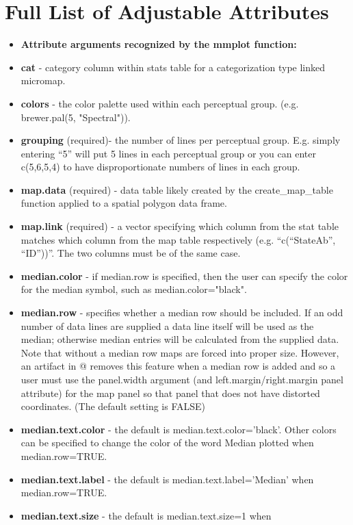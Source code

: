 \documentclass{article}
\begin{document}
\section{Full List of Adjustable Attributes}
\begin{itemize}
\item  \textbf{Attribute arguments recognized by the mmplot function:}
\item  \textbf{cat} - category column within stats table for a categorization type linked micromap.
\item  \textbf{colors} - the color palette used within each perceptual group. (e.g. brewer.pal(5, "Spectral")).
\item  \textbf{grouping} (required)- the number of lines per perceptual group. E.g. simply entering ``5'' will put 5 lines in each
perceptual group or you can enter c(5,6,5,4) to have disproportionate numbers of lines in each group.
\item  \textbf{map.data} (required) - data table likely created by the create\_map\_table function applied to a spatial polygon data frame.
\item  \textbf{map.link} (required) - a vector specifying which column from the stat table matches which column from the map table respectively (e.g. ``c(``StateAb'', ``ID''))''. The two columns must be of the same case.
\item \textbf{median.color} - if median.row is specified, then the user can specify the color for the median symbol, such as median.color="black".
\item  \textbf{median.row} - specifies whether a median row should be included. If an odd number of data lines are supplied a data line itself will be used as the median; otherwise median entries will be calculated from the supplied data. Note that without a median row maps are forced into proper size. However, an artifact in @ removes this feature when a median row is added and so a user must use the panel.width argument (and left.margin/right.margin panel attribute) for the map panel so that panel that does not have distorted coordinates. (The default setting is FALSE)
\item \textbf{median.text.color} - the default is median.text.color='black'.  Other colors can be specified to change the color of the word Median plotted when median.row=TRUE.
\item \textbf{median.text.label} - the default is median.text.label='Median' when median.row=TRUE.
\item \textbf{median.text.size} - the default is median.text.size=1 when

\end{itemize}
\end{document}
